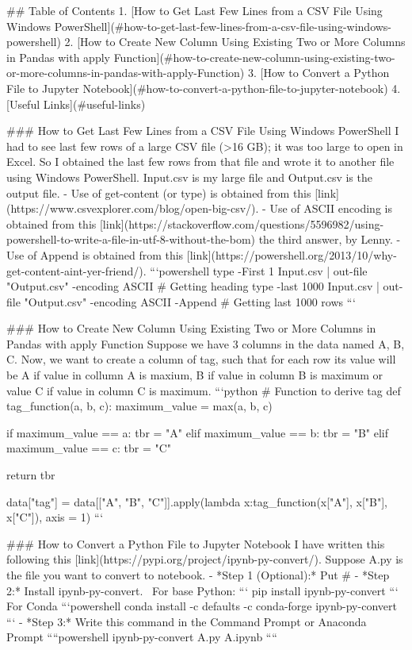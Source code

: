 ## Table of Contents
1. [How to Get Last Few Lines from a CSV File Using Windows PowerShell](#how-to-get-last-few-lines-from-a-csv-file-using-windows-powershell)
2. [How to Create New Column Using Existing Two or More Columns in Pandas with apply Function](#how-to-create-new-column-using-existing-two-or-more-columns-in-pandas-with-apply-Function)
3. [How to Convert a Python File to Jupyter Notebook](#how-to-convert-a-python-file-to-jupyter-notebook)
4. [Useful Links](#useful-links)


### How to Get Last Few Lines from a CSV File Using Windows PowerShell
I had to see last few rows of a large CSV file (>16 GB); it was too large to open in Excel. So I obtained the last few rows from that file and wrote it to another file using Windows PowerShell. Input.csv is my large file and Output.csv is the output file.
- Use of get-content (or type) is obtained from this [link](https://www.csvexplorer.com/blog/open-big-csv/).
- Use of ASCII encoding is obtained from this [link](https://stackoverflow.com/questions/5596982/using-powershell-to-write-a-file-in-utf-8-without-the-bom) the third answer, by Lenny.
- Use of Append is obtained from this [link](https://powershell.org/2013/10/why-get-content-aint-yer-friend/).
```powershell
type -First 1 Input.csv | out-file "Output.csv" -encoding ASCII                # Getting heading
type -last 1000 Input.csv | out-file "Output.csv" -encoding ASCII -Append      # Getting last 1000 rows
```


### How to Create New Column Using Existing Two or More Columns in Pandas with apply Function
Suppose we have 3 columns in the data named A, B, C. Now, we want to create a column of tag, such that for each row its value will be A if value in collumn A is maxium, B if value in column B is maximum or value C if value in column C is maximum.
```python
# Function to derive tag
def tag_function(a, b, c):
    maximum_value = max(a, b, c)
    
    if maximum_value == a:
        tbr = "A"
    elif maximum_value == b:
        tbr = "B"
    elif maximum_value == c:
        tbr = "C"
    
    return tbr


data["tag"] = data[["A", "B", "C"]].apply(lambda x:tag_function(x["A"], x["B"], x["C"]), axis = 1)
```


### How to Convert a Python File to Jupyter Notebook
I have written this following this [link](https://pypi.org/project/ipynb-py-convert/). Suppose A.py is the file you want to convert to notebook.
- *Step 1 (Optional):* Put #%
- *Step 2:* Install ipynb-py-convert. \
For base Python: 
    ```
    pip install ipynb-py-convert
    ```
    For Conda
    ```powershell
    conda install -c defaults -c conda-forge ipynb-py-convert
    ```
- *Step 3:* Write this command in the Command Prompt or Anaconda Prompt
    ````powershell
    ipynb-py-convert A.py A.ipynb
    ````

